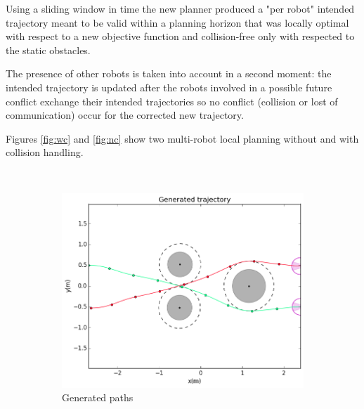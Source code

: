 Using a sliding window in time the new planner produced a "per robot" intended trajectory meant to be valid within a planning horizon that was locally optimal with respect to a new objective function and collision-free only with respected to the static obstacles.

The presence of other robots is taken into account in a second moment: the intended trajectory is updated after the robots involved in a possible future conflict exchange their intended trajectories so no conflict (collision or lost of communication) occur for the corrected new trajectory.

Figures \ref{fig:wc} and \ref{fig:nc} show two multi-robot local planning without and with collision handling.

\begin{figure}[!h]
        \centering
        ~ %
        \begin{subfigure}[b]{0.48\textwidth}
                \includegraphics[width=\textwidth]{./images/pwc.png}
                \caption{Generated paths}\label{fig:pwc}
        \end{subfigure}
        ~ %
        \begin{subfigure}[b]{0.48\textwidth}

\end{subfigure}
\end{figure}
